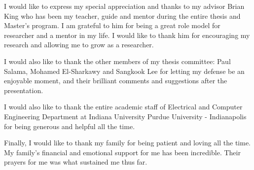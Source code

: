 
%
%
%
%
%


\begin{acknowledgments}
  I would like to express my special appreciation and thanks to my advisor Brian King who has been my teacher, guide and mentor during the entire thesis and Master's program.
  I am grateful to him for being a great role model for researcher and a mentor in my life.
  I would like to thank him for encouraging my research and allowing me to grow as a researcher.

  I would also like to thank the other members of my thesis committee: Paul Salama, Mohamed El-Sharkawy and Sangkook Lee for letting my defense be an enjoyable moment, and their brilliant comments and suggestions after the presentation. 

  I would also like to thank the entire academic staff of Electrical and Computer Engineering Department at Indiana University Purdue University - Indianapolis for being generous and helpful all the time. 

  Finally, I would like to thank my family for being patient and loving all the time.
  My family's financial and emotional support for me has been incredible.
  Their prayers for me was what sustained me thus far.    

\end{acknowledgments}

